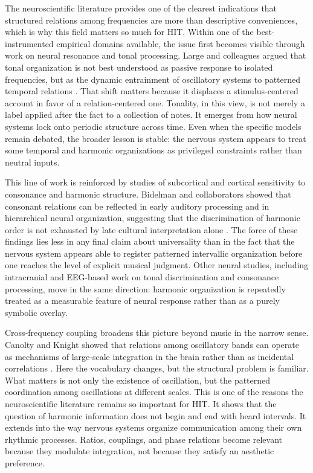 The neuroscientific literature provides one of the clearest indications that structured relations among frequencies are more than descriptive conveniences, which is why this field matters so much for HIT. Within one of the best-instrumented empirical domains available, the issue first becomes visible through work on neural resonance and tonal processing. Large and colleagues argued that tonal organization is not best understood as passive response to isolated frequencies, but as the dynamic entrainment of oscillatory systems to patterned temporal relations \parencite{large_2005, large_2012}. That shift matters because it displaces a stimulus-centered account in favor of a relation-centered one. Tonality, in this view, is not merely a label applied after the fact to a collection of notes. It emerges from how neural systems lock onto periodic structure across time. Even when the specific models remain debated, the broader lesson is stable: the nervous system appears to treat some temporal and harmonic organizations as privileged constraints rather than neutral inputs.

This line of work is reinforced by studies of subcortical and cortical sensitivity to consonance and harmonic structure. Bidelman and collaborators showed that consonant relations can be reflected in early auditory processing and in hierarchical neural organization, suggesting that the discrimination of harmonic order is not exhausted by late cultural interpretation alone \parencite{bidelman_2009, bidelman_2011}. The force of these findings lies less in any final claim about universality than in the fact that the nervous system appears able to register patterned intervallic organization before one reaches the level of explicit musical judgment. Other neural studies, including intracranial and EEG-based work on tonal discrimination and consonance processing, move in the same direction: harmonic organization is repeatedly treated as a measurable feature of neural response rather than as a purely symbolic overlay.

Cross-frequency coupling broadens this picture beyond music in the narrow sense. Canolty and Knight showed that relations among oscillatory bands can operate as mechanisms of large-scale integration in the brain rather than as incidental correlations \parencite{canolty_2010}. Here the vocabulary changes, but the structural problem is familiar. What matters is not only the existence of oscillation, but the patterned coordination among oscillations at different scales. This is one of the reasons the neuroscientific literature remains so important for HIT. It shows that the question of harmonic information does not begin and end with heard intervals. It extends into the way nervous systems organize communication among their own rhythmic processes. Ratios, couplings, and phase relations become relevant because they modulate integration, not because they satisfy an aesthetic preference.


